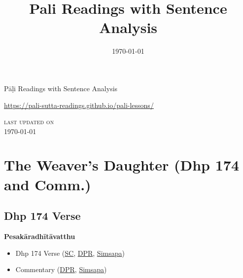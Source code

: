 \documentclass[11pt,oneside]{memoir}
\date{\today}
\title{Pali Readings with Sentence Analysis}
\begin{document}
\maketitle
\frontmatter

{\centering

{\Huge Pāḷi Readings with Sentence Analysis}

\bigskip
\href{https://pali-sutta-readings.github.io/pali-lessons/}{https://pali-sutta-readings.github.io/pali-lessons/}

{\scshape\small last updated on}\\
\today

}

\bigskip
\tableofcontents*

\mainmatter

\yournamefalse

\newlength{\colOne}\setlength{\colOne}{0.35\linewidth}
\newlength{\colTwo}\setlength{\colTwo}{0.6\linewidth}

\renewenvironment{quote}%
{\list{}{%
    \doubleLineSize
    \listparindent 0pt
    \itemindent    0pt
    \leftmargin    3em
    \rightmargin   3em
    \parsep        0pt
    \topsep        8pt
    \partopsep     0pt}%
\item[] \raggedright}%
{\endlist}

\chapter{The Weaver's Daughter (Dhp 174 and Comm.)}
\label{sec:org923c637}
\section{Dhp 174 Verse}
\label{sec:org5eea5ce}

\textbf{\textbf{Pesakāradhītāvatthu}}

\begin{itemize}
\item Dhp 174 Verse (\href{https://suttacentral.net/dhp167-178/pli/ms}{SC}, \href{https://www.digitalpalireader.online/\_dprhtml/index.html?loc=k.1.0.0.12.0.0.m}{DPR}, \href{http://localhost:4848/suttas/dhp167-178/pli/ms?quote=Andhabh\%25C5\%25ABto\%2520aya\%25E1\%25B9\%2581\%2520loko\&window\_type=Sutta+Study}{Simsapa})
\item Commentary (\href{https://www.digitalpalireader.online/\_dprhtml/index.html?loc=k.1.0.1.4.6.x.a}{DPR}, \href{http://localhost:4848/suttas/s0502a.att/pli/cst4?quote=andhabh\%25C5\%25ABtoti\%2520ima\%25E1\%25B9\%2581\%2520dhammadesana\%25E1\%25B9\%2581\&window\_type=Sutta+Study}{Simsapa})
\end{itemize}
\end{document}
